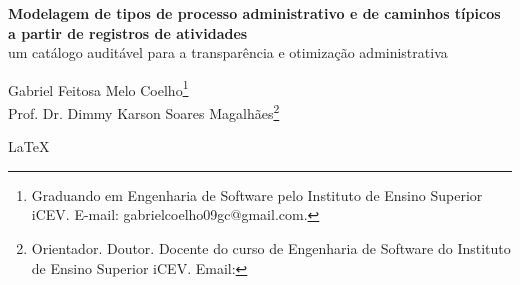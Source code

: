 \documentclass[12pt,a4paper]{article}
\newcommand{\TITULO}{Modelagem de tipos de processo administrativo e de caminhos típicos
a partir de registros de atividades}
\newcommand{\SUBTITULO}{um catálogo auditável para a transparência e otimização administrativa}
\newcommand{\AUTOR}{Gabriel Feitosa Melo Coelho}
\newcommand{\ORIENTADOR}{Prof. Dr. Dimmy Karson Soares Magalhães}
\begin{document}
\onehalfspacing
\justifying

\begin{center}
{\bfseries\large \TITULO}\\[2pt]
{\large \SUBTITULO}
\end{center}

\vspace{1.5\baselineskip}

\begin{flushright}
\AUTOR\footnote{Graduando em Engenharia de Software pelo Instituto de Ensino Superior
iCEV. E-mail: gabrielcoelho09gc@gmail.com.}\\
\ORIENTADOR\footnote{Orientador. Doutor. Docente do curso de Engenharia de Software do
Instituto de Ensino Superior iCEV. Email: }
\end{flushright}

\vspace{1.5\baselineskip}






LaTeX







\end{document}
